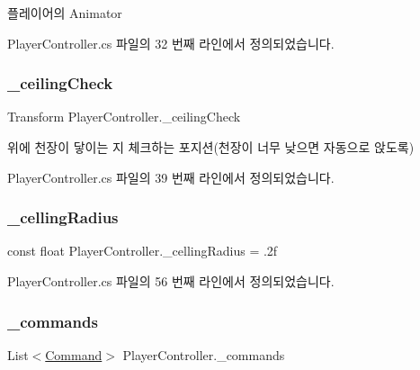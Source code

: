 플레이어의 Animator 



Player\+Controller.\+cs 파일의 32 번째 라인에서 정의되었습니다.

\mbox{\label{class_player_controller_a932dbf6c5cc4527856596dc1f9df1426}} 
\subsubsection{\texorpdfstring{\_ceilingCheck}{\_ceilingCheck}}
{\footnotesize\ttfamily Transform Player\+Controller.\+\_\+ceiling\+Check\hspace{0.3cm}{\ttfamily [private]}}



위에 천장이 닿이는 지 체크하는 포지션(천장이 너무 낮으면 자동으로 앉도록) 



Player\+Controller.\+cs 파일의 39 번째 라인에서 정의되었습니다.

\mbox{\label{class_player_controller_a306070e77c6bcd09f4fed177c876684f}} 
\subsubsection{\texorpdfstring{\_cellingRadius}{\_cellingRadius}}
{\footnotesize\ttfamily const float Player\+Controller.\+\_\+celling\+Radius = .\+2f\hspace{0.3cm}{\ttfamily [private]}}



Player\+Controller.\+cs 파일의 56 번째 라인에서 정의되었습니다.

\mbox{\label{class_player_controller_aab899fbdea369867174253d2efd978fe}} 
\subsubsection{\texorpdfstring{\_commands}{\_commands}}
{\footnotesize\ttfamily List$<$\mbox{\hyperlink{class_command}{Command}}$>$ Player\+Controller.\+\_\+commands\hspace{0.3cm}{\ttfamily [private]}}



